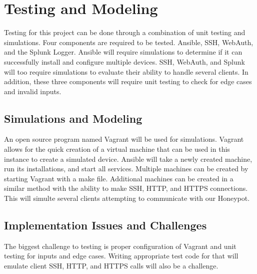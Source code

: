 \chapter{Testing and Modeling}
Testing for this project can be done through a combination of unit testing and simulations. Four components are required to be tested. Ansible, SSH, WebAuth, and the Splunk Logger. Ansible will require simulations to determine if it can successfully install and configure multiple devices. SSH, WebAuth, and Splunk will too require simulations to evaluate their ability to handle several clients. In addition, these three components will require unit testing to check for edge cases and invalid inputs.

\section{Simulations and Modeling}
An open source program named Vagrant will be used for simulations. Vagrant allows for the quick creation of a virtual machine that can be used in this instance to create a simulated device. Ansible will take a newly created machine, run its installations, and start all services. Multiple machines can be created by starting Vagrant with a make file. Additional machines can be created in a similar method with the ability to make SSH, HTTP, and HTTPS connections. This will simulte several clients attempting to communicate with our Honeypot.

\section{Implementation Issues and Challenges}
The biggest challenge to testing is proper configuration of Vagrant and unit testing for inputs and edge cases. Writing appropriate test code for that will emulate client SSH, HTTP, and HTTPS calls will also be a challenge.

